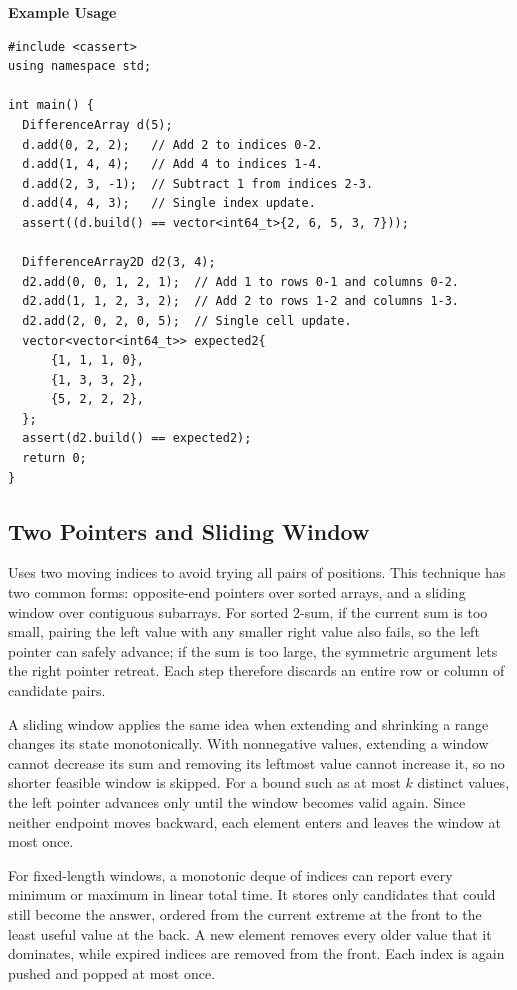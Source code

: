 \textbf{Example Usage}\par
\begin{lstlisting}[style=cpp]
#include <cassert>
using namespace std;

int main() {
  DifferenceArray d(5);
  d.add(0, 2, 2);   // Add 2 to indices 0-2.
  d.add(1, 4, 4);   // Add 4 to indices 1-4.
  d.add(2, 3, -1);  // Subtract 1 from indices 2-3.
  d.add(4, 4, 3);   // Single index update.
  assert((d.build() == vector<int64_t>{2, 6, 5, 3, 7}));

  DifferenceArray2D d2(3, 4);
  d2.add(0, 0, 1, 2, 1);  // Add 1 to rows 0-1 and columns 0-2.
  d2.add(1, 1, 2, 3, 2);  // Add 2 to rows 1-2 and columns 1-3.
  d2.add(2, 0, 2, 0, 5);  // Single cell update.
  vector<vector<int64_t>> expected2{
      {1, 1, 1, 0},
      {1, 3, 3, 2},
      {5, 2, 2, 2},
  };
  assert(d2.build() == expected2);
  return 0;
}
\end{lstlisting}
\subsection{Two Pointers and Sliding Window}
\label{sec:1.2.3}
Uses two moving indices to avoid trying all pairs of positions. This technique has two common forms: opposite-end pointers over sorted arrays, and a sliding window over contiguous subarrays. For sorted 2-sum, if the current sum is too small, pairing the left value with any smaller right value also fails, so the left pointer can safely advance; if the sum is too large, the symmetric argument lets the right pointer retreat. Each step therefore discards an entire row or column of candidate pairs.

A sliding window applies the same idea when extending and shrinking a range changes its state monotonically. With nonnegative values, extending a window cannot decrease its sum and removing its leftmost value cannot increase it, so no shorter feasible window is skipped. For a bound such as at most $k$ distinct values, the left pointer advances only until the window becomes valid again. Since neither endpoint moves backward, each element enters and leaves the window at most once.

For fixed-length windows, a monotonic deque of indices can report every minimum or maximum in linear total time. It stores only candidates that could still become the answer, ordered from the current extreme at the front to the least useful value at the back. A new element removes every older value that it dominates, while expired indices are removed from the front. Each index is again pushed and popped at most once.

